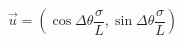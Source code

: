 \begin{equation}
\vec u=(\cos \Delta \theta \frac{\sigma}{L}, \sin \Delta \theta 
\frac{\sigma}{L})
\end{equation}

